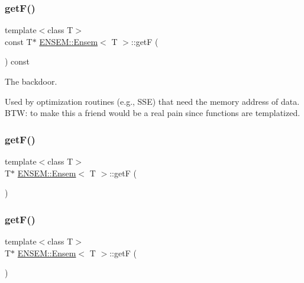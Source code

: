 \subsubsection{\texorpdfstring{getF()}{getF()}\hspace{0.1cm}{\footnotesize\ttfamily [2/4]}}
{\footnotesize\ttfamily template$<$class T$>$ \\
const T$\ast$ \mbox{\hyperlink{classENSEM_1_1Ensem}{E\+N\+S\+E\+M\+::\+Ensem}}$<$ T $>$\+::getF (\begin{DoxyParamCaption}{ }\end{DoxyParamCaption}) const\hspace{0.3cm}{\ttfamily [inline]}}



The backdoor. 

Used by optimization routines (e.\+g., S\+SE) that need the memory address of data. B\+TW\+: to make this a friend would be a real pain since functions are templatized. \mbox{\label{classENSEM_1_1Ensem_ab2909a7d9b171d7e2ba7365c5e962aa6}} 
\subsubsection{\texorpdfstring{getF()}{getF()}\hspace{0.1cm}{\footnotesize\ttfamily [3/4]}}
{\footnotesize\ttfamily template$<$class T$>$ \\
T$\ast$ \mbox{\hyperlink{classENSEM_1_1Ensem}{E\+N\+S\+E\+M\+::\+Ensem}}$<$ T $>$\+::getF (\begin{DoxyParamCaption}{ }\end{DoxyParamCaption})\hspace{0.3cm}{\ttfamily [inline]}}

\mbox{\label{classENSEM_1_1Ensem_ab2909a7d9b171d7e2ba7365c5e962aa6}} 
\subsubsection{\texorpdfstring{getF()}{getF()}\hspace{0.1cm}{\footnotesize\ttfamily [4/4]}}
{\footnotesize\ttfamily template$<$class T$>$ \\
T$\ast$ \mbox{\hyperlink{classENSEM_1_1Ensem}{E\+N\+S\+E\+M\+::\+Ensem}}$<$ T $>$\+::getF (\begin{DoxyParamCaption}{ }\end{DoxyParamCaption})\hspace{0.3cm}{\ttfamily [inline]}}

